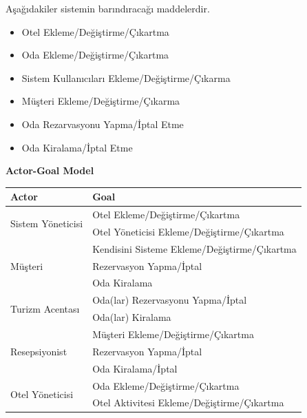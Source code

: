 \documentclass[12pt,a4paper]{report}
\begin{document}
Aşağıdakiler sistemin barındıracağı maddelerdir.

\begin{itemize}

\item Otel Ekleme/Değiştirme/Çıkartma
\item Oda Ekleme/Değiştirme/Çıkartma
\item Sistem Kullanıcıları Ekleme/Değiştirme/Çıkarma
\item Müşteri Ekleme/Değiştirme/Çıkarma
\item Oda Rezarvasyonu Yapma/İptal Etme
\item Oda Kiralama/İptal Etme

\end{itemize}

\newpage

{
\bf
\center
Actor-Goal Model \\[1cm]
}
\begin{tabular}{ |p{5cm} | p{9cm} |}

\hline
\bf Actor & \bf Goal \\ 
\hline

\multirow{2}{*}{Sistem Yöneticisi}
& 
Otel Ekleme/Değiştirme/Çıkartma \\
&
Otel Yöneticisi Ekleme/Değiştirme/Çıkartma \\

\hline

\multirow{3}{*}{Müşteri}
&
Kendisini Sisteme Ekleme/Değiştirme/Çıkartma \\
&
Rezervasyon Yapma/İptal \\
&
Oda Kiralama \\

\hline

\multirow{2}{*}{Turizm Acentası}
&
Oda(lar) Rezervasyonu Yapma/İptal \\
&
Oda(lar) Kiralama \\

\hline

\multirow{3}{*}{Resepsiyonist}
&
Müşteri Ekleme/Değiştirme/Çıkartma \\
&
Rezervasyon Yapma/İptal \\
&
Oda Kiralama/İptal \\

\hline

\multirow{2}{*}{Otel Yöneticisi}
&
Oda Ekleme/Değiştirme/Çıkartma \\
&
Otel Aktivitesi Ekleme/Değiştirme/Çıkartma \\

\hline

\end{tabular}
\end{document}
